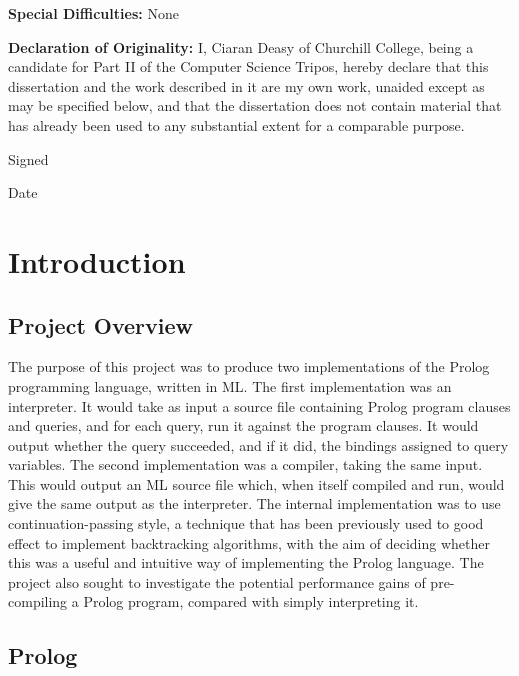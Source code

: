 \documentclass[12pt]{article}
\begin{document}
\vspace{0.25in}

{\bf Special Difficulties:} None

{\bf Declaration of Originality:}
I, Ciaran Deasy of Churchill College, being a candidate for Part II of the Computer Science Tripos, hereby declare that this dissertation and the work described in it are my own work, unaided except as may be specified below, and that the dissertation does not contain material that has already been used to any substantial extent for a comparable purpose. 

Signed %

Date %

\vfil
\eject

\tableofcontents 

\newpage

\section{Introduction}


\subsection{Project Overview}

The purpose of this project was to produce two implementations of the Prolog programming language, written in ML. 
The first implementation was an interpreter.
It would take as input a source file containing Prolog program clauses and queries, and for each query, run it against the program clauses. 
It would output whether the query succeeded, and if it did, the bindings assigned to query variables.
The second implementation was a compiler, taking the same input. 
This would output an ML source file which, when itself compiled and run, would give the same output as the interpreter.
The internal implementation was to use continuation-passing style, a technique that has been previously used to good effect to implement backtracking algorithms, with the aim of deciding whether this was a useful and intuitive way of implementing the Prolog language. 
The project also sought to investigate the potential performance gains of pre-compiling a Prolog program, compared with simply interpreting it.

\subsection{Prolog}
\end{document}
